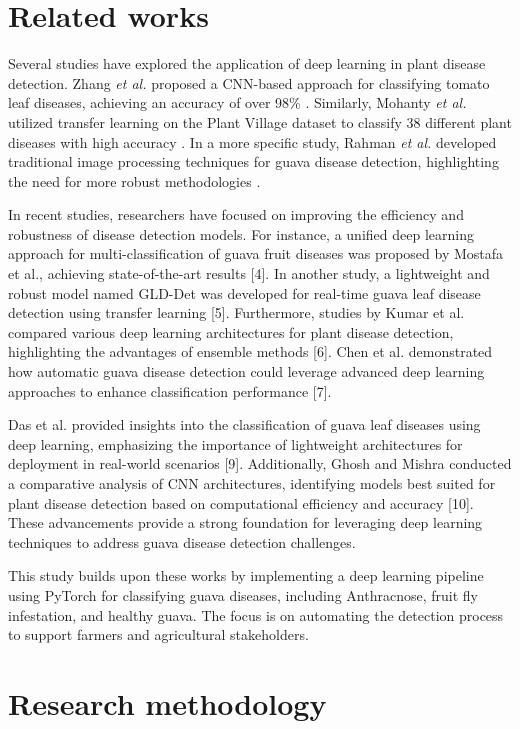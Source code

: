 \documentclass[conference]{IEEEtran}
\begin{document}
\section{Related works}

Several studies have explored the application of deep learning in plant disease detection. Zhang \textit{et al.} proposed a CNN-based approach for classifying tomato leaf diseases, achieving an accuracy of over 98\% \cite{zhang2019}. Similarly, Mohanty \textit{et al.} utilized transfer learning on the Plant Village dataset to classify 38 different plant diseases with high accuracy \cite{mohanty2016}. In a more specific study, Rahman \textit{et al.} developed traditional image processing techniques for guava disease detection, highlighting the need for more robust methodologies \cite{rahman2020}.

In recent studies, researchers have focused on improving the efficiency and robustness of disease detection models. For instance, a unified deep learning approach for multi-classification of guava fruit diseases was proposed by Mostafa et al., achieving state-of-the-art results [4]. In another study, a lightweight and robust model named GLD-Det was developed for real-time guava leaf disease detection using transfer learning [5]. Furthermore, studies by Kumar et al. compared various deep learning architectures for plant disease detection, highlighting the advantages of ensemble methods [6]. Chen et al. demonstrated how automatic guava disease detection could leverage advanced deep learning approaches to enhance classification performance [7].

Das et al. provided insights into the classification of guava leaf diseases using deep learning, emphasizing the importance of lightweight architectures for deployment in real-world scenarios [9]. Additionally, Ghosh and Mishra conducted a comparative analysis of CNN architectures, identifying models best suited for plant disease detection based on computational efficiency and accuracy [10]. These advancements provide a strong foundation for leveraging deep learning techniques to address guava disease detection challenges.

This study builds upon these works by implementing a deep learning pipeline using PyTorch for classifying guava diseases, including Anthracnose, fruit fly infestation, and healthy guava. The focus is on automating the detection process to support farmers and agricultural stakeholders.

\section{Research methodology}
\end{document}
